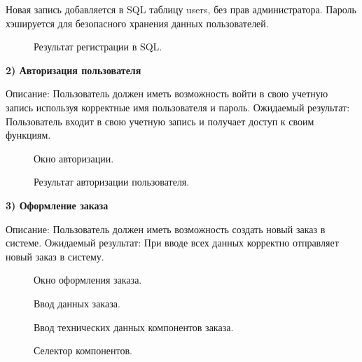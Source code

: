 Новая запись добавляется в SQL таблицу users, без прав администратора. Пароль хэшируется для безопасного хранения данных пользователей.

\begin{figure}[ht]
	\caption{Результат регистрации в SQL.}
	\label{storedf:login1}
\end{figure}

\textbf{2) Авторизация пользователя}

Описание: Пользователь должен иметь возможность войти в свою учетную запись используя корректные имя пользователя и пароль.
Ожидаемый результат: Пользователь входит в свою учетную запись и получает доступ к своим функциям.

\begin{figure}[ht]
	\caption{Окно авторизации.}
	\label{storedf:loginad}
\end{figure}

\begin{figure}[ht]
	\caption{Результат авторизации пользователя.}
	\label{storedf:panel0}
\end{figure}

\newpage

\textbf{3) Оформление заказа}

Описание: Пользователь должен иметь возможность создать новый заказ в системе.
Ожидаемый результат:  При вводе всех данных корректно отправляет новый заказ в систему.

\begin{figure}[ht]
	\caption{Окно оформления заказа.}
	\label{storedf:form0}
\end{figure}

\begin{figure}[ht]
	\caption{Ввод данных заказа.}
	\label{storedf:form1}
\end{figure}

\begin{figure}[ht]
	\caption{Ввод технических данных компонентов заказа.}
	\label{storedf:form2}
\end{figure}

\begin{figure}[ht]
	\caption{Селектор компонентов.}
	\label{storedf:formsearch0}
\end{figure}

